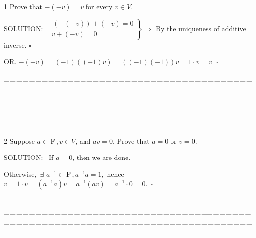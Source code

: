 \documentclass[a4paper, 11pt, UTF8]{article}
\def\Fbf{$\,{\timesbf F}\,$}
\begin{document}
\begin{large}
{\timesbf\Large 1} {\timessl\Large 
Prove that $−(−v) = v$ for every $v\in V$.
}\par
{\timesbf S\footnotesize{OLUTION:}}\,\,\,
$\left.\begin{array}{l}\,(-(-v))+(-v)=0\\ v+(-v)=0\end{array}\right\}\Rightarrow$ By the uniqueness of additive inverse. $\square$\par\quad
O{\small R}. $-(-v)=(-1)((-1)v)=((-1)(-1))v=1\cdot v=v\,\,\,\square$
\par
{\tiny \_\,\_\,\_\,\_\,\_\,\_\,\_\,\_\,\_\,\_\,\_\,\_\,\_\,\_\,\_\,\_\,\_\,\_\,\_\,\_\,\_\,\_\,\_\,\_\,\_\,\_\,\_\,\_\,\_\,\_\,\_\,\_\,\_\,\_\,\_\,\_\,\_\,\_\,\_\,\_\,\_\,\_\,\_\,\_\,\_\,\_\,\_\,\_\,\_\,\_\,\_\,\_\,\_\,\_\,\_\,\_\,\_\,\_\,\_\,\_\,\_\,\_\,\_\,\_\,\_\,\_\,\_\,\_\,\_\,\_\,\_\_\,\_\,\_\,\_\,\_\,\_\,\_\,\_\,\_\,\_\,\_\,\_\,\_\,\_\,\_\,\_\,\_\,\_\,\_\,\_\,\_\,\_\,\_\,\_\,\_\,\_\,\_\,\_\,\_\,\_\,\_\,\_\,\_\,\_\,\_\,\_\,\_\,\_\,\_\,\_\,\_\,\_\,\_\,\_\,\_\,\_\,\_\,\_\,\_\,\_\,\_\,\_\,\_\,\_\,\_\,\_\,\_\,\_\,\_\,\_\,\_\,\_\,\_\,\_\,\_\,\_\,\_\,\_\,\_\,\_\,\_}{\tiny\,\par}

{\timesbf\Large 2} {\timessl\Large 
Suppose $a\in\Fbf,v\in V$, and $av = 0$. Prove that $a = 0$ or $v = 0$.
}\par
{\timesbf S\footnotesize{OLUTION:}}\,\,\,
If $a=0$, then we are done.\par\qquad\qquad\quad
Otherwise, $\,\exists\,\,a^{-1}\in\Fbf,a^{-1}a=1,$ hence $v=1\cdot v=(a^{-1}a)v=a^{-1}(av)=a^{-1}\cdot 0=0.\,\,\,\square$\par
{\tiny \_\,\_\,\_\,\_\,\_\,\_\,\_\,\_\,\_\,\_\,\_\,\_\,\_\,\_\,\_\,\_\,\_\,\_\,\_\,\_\,\_\,\_\,\_\,\_\,\_\,\_\,\_\,\_\,\_\,\_\,\_\,\_\,\_\,\_\,\_\,\_\,\_\,\_\,\_\,\_\,\_\,\_\,\_\,\_\,\_\,\_\,\_\,\_\,\_\,\_\,\_\,\_\,\_\,\_\,\_\,\_\,\_\,\_\,\_\,\_\,\_\,\_\,\_\,\_\,\_\,\_\,\_\,\_\,\_\,\_\,\_\_\,\_\,\_\,\_\,\_\,\_\,\_\,\_\,\_\,\_\,\_\,\_\,\_\,\_\,\_\,\_\,\_\,\_\,\_\,\_\,\_\,\_\,\_\,\_\,\_\,\_\,\_\,\_\,\_\,\_\,\_\,\_\,\_\,\_\,\_\,\_\,\_\,\_\,\_\,\_\,\_\,\_\,\_\,\_\,\_\,\_\,\_\,\_\,\_\,\_\,\_\,\_\,\_\,\_\,\_\,\_\,\_\,\_\,\_\,\_\,\_\,\_\,\_\,\_\,\_\,\_\,\_\,\_\,\_\,\_\,\_}{\tiny\,\par}


\end{large}
\end{document}
